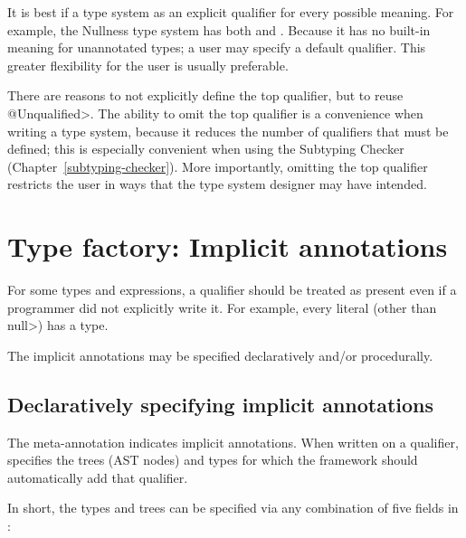It is best if a type system as an explicit qualifier for every
possible meaning.  For example,
the Nullness type system has both  and
.  Because it has no built-in meaning
for unannotated types; a user may specify a default qualifier.  This
greater flexibility for the user is usually preferable.

There are reasons to not explicitly define the top qualifier, but to reuse
\<@Unqualified>.
The ability to omit the top qualifier is a convenience
when writing a type system, because it reduces the number of qualifiers
that must be defined; this is especially convenient when using the Subtyping
Checker (Chapter~\ref{subtyping-checker}).
More importantly, omitting the top qualifier restricts the user in ways
that the type system designer may have intended.


\section{Type factory: Implicit annotations\label{writing-type-introduction}}

For some types and expressions, a qualifier should be treated as present
even if a programmer did not explicitly write it.  For example, every
literal (other than \<null>) has a  type.

The implicit annotations may be specified declaratively and/or procedurally.


\subsection{Declaratively specifying implicit annotations\label{declarative-type-introduction}}

The  meta-annotation indicates implicit annotations.
When written on a qualifier, 
specifies the trees (AST nodes) and types for which the framework should
automatically add that qualifier.

In short, the types and trees can be
specified via any combination of five fields in :

